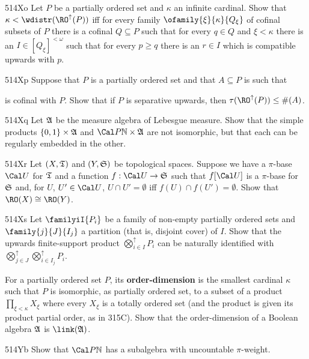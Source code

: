 {\spheader 514Xo Let $P$ be a partially ordered set and $\kappa$
an infinite cardinal.   Show that $\kappa<\wdistr(\RO^{\uparrow}(P))$
iff for every family $\ofamily{\xi}{\kappa}{Q_{\xi}}$ of cofinal subsets
of $P$ there is a cofinal $Q\subseteq P$ such that for every $q\in Q$ and
$\xi<\kappa$ there is an $I\in[Q_{\xi}]^{<\omega}$ such that for every
$p\ge q$ there is an $r\in I$ which is compatible upwards with $p$.

\spheader 514Xp Suppose that $P$ is a
partially ordered set and that $A\subseteq P$ is such that


\noindent is cofinal with $P$.   Show that if $P$ is separative upwards,
then $\tau(\RO^{\uparrow}(P))\le\#(A)$.

\spheader 514Xq Let $\frak A$ be the measure algebra of Lebesgue
measure.   Show that the simple products $\{0,1\}\times\frak A$ and
$\Cal P\Bbb N\times\frak A$ are not isomorphic, but that each can be
regularly embedded in the other.

\spheader 514Xr Let $(X,\frak T)$ and $(Y,\frak S)$ be topological
spaces.   Suppose we have a $\pi$-base $\Cal U$ for $\frak T$ and a
function $f:\Cal U\to\frak S$ such that $f[\Cal U]$ is a $\pi$-base for
$\frak S$ and, for $U$, $U'\in\Cal U$, $U\cap U'=\emptyset$ iff
$f(U)\cap f(U')=\emptyset$.   Show that $\RO(X)\cong\RO(Y)$.

\spheader 514Xs Let $\familyiI{P_i}$ be a family of non-empty partially
ordered sets and $\family{j}{J}{I_j}$ a partition (that is, disjoint
cover) of $I$.   Show that
the upwards finite-support product $\bigotimes^{\uparrow}_{i\in I}P_i$
can be naturally identified with
$\bigotimes^{\uparrow}_{j\in J}\bigotimes^{\uparrow}_{i\in I_j}P_i$.

For a partially ordered set $P$, its {\bf
order-dimension} is the smallest cardinal $\kappa$ such that $P$ is
isomorphic, as partially ordered set, to a subset of a product
$\prod_{\xi<\kappa}X_{\xi}$ where every $X_{\xi}$ is a totally ordered
set (and the product is given its product partial order, as in 315C).
Show that the order-dimension of a Boolean algebra $\frak A$ is
$\link(\frak A)$.

\spheader 514Yb Show that $\Cal P\Bbb N$ has a subalgebra with
uncountable $\pi$-weight.   

}
